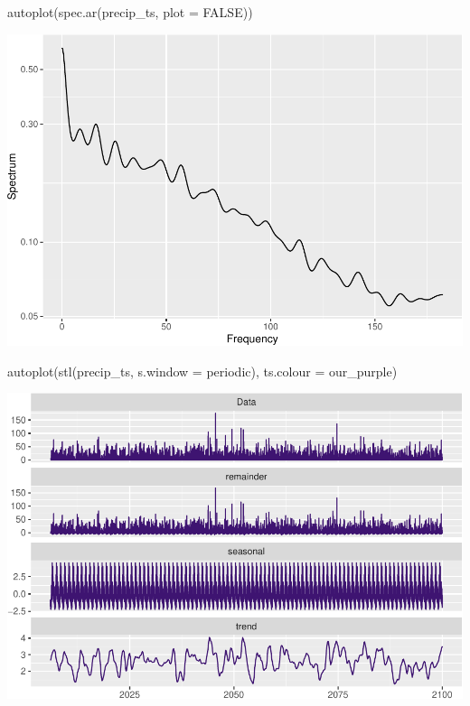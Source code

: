 \documentclass[
  paper=a4,
  ,captions=tableheading
]{scrartcl}
\newenvironment{Shaded}{\begin{snugshade}}{\end{snugshade}}
\newcommand{\AttributeTok}[1]{\textcolor[rgb]{0.77,0.63,0.00}{#1}}
\newcommand{\ConstantTok}[1]{\textcolor[rgb]{0.00,0.00,0.00}{#1}}
\newcommand{\FunctionTok}[1]{\textcolor[rgb]{0.00,0.00,0.00}{#1}}
\newcommand{\NormalTok}[1]{#1}
\newcommand{\StringTok}[1]{\textcolor[rgb]{0.31,0.60,0.02}{#1}}
\begin{document}
\begin{Shaded}
\begin{Highlighting}[]
\FunctionTok{autoplot}\NormalTok{(}\FunctionTok{spec.ar}\NormalTok{(precip\_ts, }\AttributeTok{plot =} \ConstantTok{FALSE}\NormalTok{))}
\end{Highlighting}
\end{Shaded}

\includegraphics{Haskell_files/figure-latex/unnamed-chunk-83-1.pdf}

\begin{Shaded}
\begin{Highlighting}[]
\FunctionTok{autoplot}\NormalTok{(}\FunctionTok{stl}\NormalTok{(precip\_ts, }\AttributeTok{s.window =} \StringTok{\textquotesingle{}periodic\textquotesingle{}}\NormalTok{), }\AttributeTok{ts.colour =}\NormalTok{ our\_purple)}
\end{Highlighting}
\end{Shaded}

\includegraphics{Haskell_files/figure-latex/unnamed-chunk-84-1.pdf}
\end{document}
